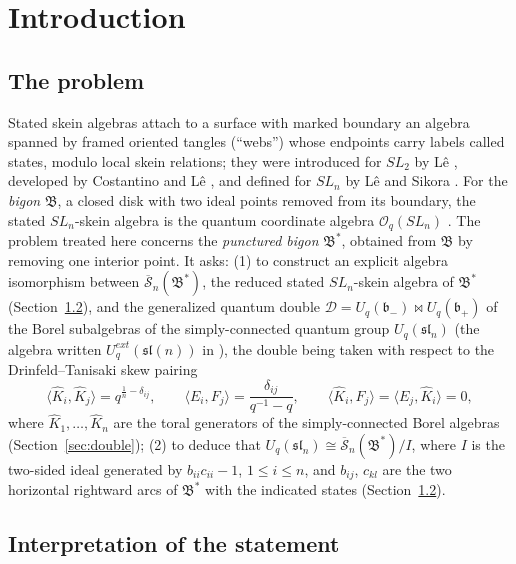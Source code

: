 \documentclass[11pt]{article}
\theoremstyle{remark}
\newcommand{\U}{U_q}
\newcommand{\slN}{\mathfrak{sl}_n}
\newcommand{\bp}{\mathfrak b_+}
\newcommand{\bm}{\mathfrak b_-}
\newcommand{\redS}{\overline{\mathcal S}_n}
\newcommand{\Bstar}{\mathfrak B^*}
\newcommand{\Bigon}{\mathfrak B}
\newcommand{\la}{\langle}
\newcommand{\ra}{\rangle}
\newcommand{\cD}{\mathcal D}
\newcommand{\Oq}{\mathcal O_q(SL_n)}
\begin{document}
\section{Introduction}

\subsection{The problem}

Stated skein algebras attach to a surface with marked boundary an
algebra spanned by framed oriented tangles (``webs'') whose endpoints
carry labels called states, modulo local skein relations; they were
introduced for $SL_2$ by L\^e \cite{Le}, developed by Costantino and
L\^e \cite{CL}, and defined for $SL_n$ by L\^e and Sikora \cite{LS}. For the \emph{bigon} $\Bigon$, a closed disk
with two ideal points removed from its boundary, the stated
$SL_n$-skein algebra is the quantum coordinate algebra $\Oq$
\cite[Theorem 6.3]{LS}. The problem treated here concerns the
\emph{punctured bigon} $\Bstar$, obtained from $\Bigon$ by removing one
interior point. It asks:
(1) to construct an explicit algebra isomorphism between
$\redS(\Bstar)$, the reduced stated $SL_n$-skein algebra of $\Bstar$
(Section~\ref{sec:interp}), and the generalized quantum double $\cD=\U(\bm)\bowtie\U(\bp)$ of the
Borel subalgebras of the simply-connected quantum group $\U(\slN)$
(the algebra written $U^{ext}_q(\mathfrak{sl}(n))$ in
\cite[Section 8.5.3]{KS}), the double being taken with respect to the
Drinfeld--Tanisaki skew pairing
\begin{equation}\label{eq:problempairing}
 \la\hat K_i,\hat K_j\ra=q^{\frac1n-\delta_{ij}},\qquad
 \la E_i,F_j\ra=\frac{\delta_{ij}}{q^{-1}-q},\qquad
 \la\hat K_i,F_j\ra=\la E_j,\hat K_i\ra=0 ,
\end{equation}
where $\hat K_1,\dots,\hat K_n$ are the toral generators of the
simply-connected Borel algebras (Section~\ref{sec:double});
(2) to deduce that $\U(\slN)\cong\redS(\Bstar)/I$, where $I$ is
the two-sided ideal generated by $b_{ii}c_{ii}-1$, $1\le i\le n$, and
$b_{ij}$, $c_{kl}$ are the two horizontal rightward arcs of $\Bstar$
with the indicated states (Section~\ref{sec:interp}).

\subsection{Interpretation of the statement}\label{sec:interp}
\end{document}
